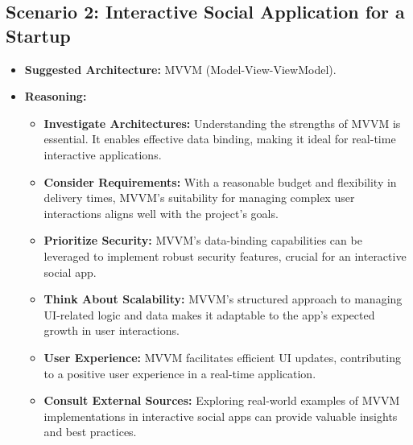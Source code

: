 \subsection*{Scenario 2: Interactive Social Application for a Startup}
\begin{itemize}
	\item \textbf{Suggested Architecture:} MVVM (Model-View-ViewModel).
	\item \textbf{Reasoning:}
	\begin{itemize}
		\item \textbf{Investigate Architectures:} Understanding the strengths of MVVM is essential. It enables effective data binding, making it ideal for real-time interactive applications.
		\item \textbf{Consider Requirements:} With a reasonable budget and flexibility in delivery times, MVVM's suitability for managing complex user interactions aligns well with the project's goals.
		\item \textbf{Prioritize Security:} MVVM's data-binding capabilities can be leveraged to implement robust security features, crucial for an interactive social app.
		\item \textbf{Think About Scalability:} MVVM's structured approach to managing UI-related logic and data makes it adaptable to the app's expected growth in user interactions.
		\item \textbf{User Experience:} MVVM facilitates efficient UI updates, contributing to a positive user experience in a real-time application.
		\item \textbf{Consult External Sources:} Exploring real-world examples of MVVM implementations in interactive social apps can provide valuable insights and best practices.
	\end{itemize}
\end{itemize}

